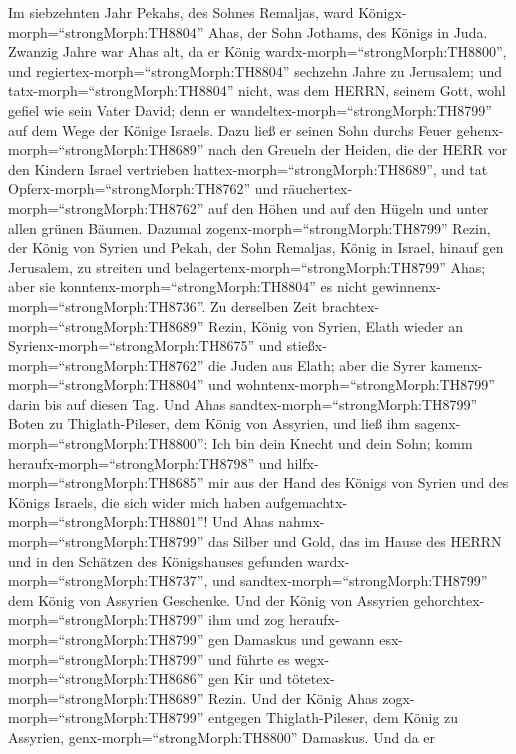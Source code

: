  Im siebzehnten Jahr Pekahs, des Sohnes Remaljas, ward
Königx-morph=``strongMorph:TH8804'' Ahas, der Sohn Jothams, des Königs
in Juda.  Zwanzig Jahre war Ahas alt, da er König
wardx-morph=``strongMorph:TH8800'', und
regiertex-morph=``strongMorph:TH8804'' sechzehn Jahre zu Jerusalem; und
tatx-morph=``strongMorph:TH8804'' nicht, was dem HERRN, seinem Gott,
wohl gefiel wie sein Vater David;  denn er
wandeltex-morph=``strongMorph:TH8799'' auf dem Wege der Könige Israels.
Dazu ließ er seinen Sohn durchs Feuer
gehenx-morph=``strongMorph:TH8689'' nach den Greueln der Heiden, die der
HERR vor den Kindern Israel vertrieben
hattex-morph=``strongMorph:TH8689'',  und tat
Opferx-morph=``strongMorph:TH8762'' und
räuchertex-morph=``strongMorph:TH8762'' auf den Höhen und auf den Hügeln
und unter allen grünen Bäumen.  Dazumal
zogenx-morph=``strongMorph:TH8799'' Rezin, der König von Syrien und
Pekah, der Sohn Remaljas, König in Israel, hinauf gen Jerusalem, zu
streiten und belagertenx-morph=``strongMorph:TH8799'' Ahas; aber sie
konntenx-morph=``strongMorph:TH8804'' es nicht
gewinnenx-morph=``strongMorph:TH8736''.  Zu derselben Zeit
brachtex-morph=``strongMorph:TH8689'' Rezin, König von Syrien, Elath
wieder an Syrienx-morph=``strongMorph:TH8675'' und
stießx-morph=``strongMorph:TH8762'' die Juden aus Elath; aber die Syrer
kamenx-morph=``strongMorph:TH8804'' und
wohntenx-morph=``strongMorph:TH8799'' darin bis auf diesen Tag.
 Und Ahas sandtex-morph=``strongMorph:TH8799'' Boten zu
Thiglath-Pileser, dem König von Assyrien, und ließ ihm
sagenx-morph=``strongMorph:TH8800'': Ich bin dein Knecht und dein Sohn;
komm heraufx-morph=``strongMorph:TH8798'' und
hilfx-morph=``strongMorph:TH8685'' mir aus der Hand des Königs von
Syrien und des Königs Israels, die sich wider mich haben
aufgemachtx-morph=``strongMorph:TH8801''!  Und Ahas
nahmx-morph=``strongMorph:TH8799'' das Silber und Gold, das im Hause des
HERRN und in den Schätzen des Königshauses gefunden
wardx-morph=``strongMorph:TH8737'', und
sandtex-morph=``strongMorph:TH8799'' dem König von Assyrien Geschenke.
 Und der König von Assyrien
gehorchtex-morph=``strongMorph:TH8799'' ihm und zog
heraufx-morph=``strongMorph:TH8799'' gen Damaskus und gewann
esx-morph=``strongMorph:TH8799'' und führte es
wegx-morph=``strongMorph:TH8686'' gen Kir und
tötetex-morph=``strongMorph:TH8689'' Rezin.  Und der König
Ahas zogx-morph=``strongMorph:TH8799'' entgegen Thiglath-Pileser, dem
König zu Assyrien, genx-morph=``strongMorph:TH8800'' Damaskus. Und da er
